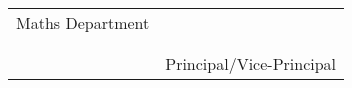 \documentclass[17pt]{extarticle}
\begin{document}
\vspace{1cm}

\begin{tabu} to 1\textwidth {X[l] X[r]}
  Maths Department &  \ \ \ \  \\
 \\ \\ 
  & Principal/Vice-Principal
\end{tabu}
\end{document}
